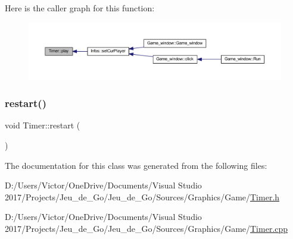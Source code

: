 Here is the caller graph for this function\+:\nopagebreak
\begin{figure}[H]
\begin{center}
\leavevmode
\includegraphics[width=350pt]{class_timer_a84acbe09a8dddae46c997c57a70c5076_icgraph}
\end{center}
\end{figure}
\mbox{\label{class_timer_aa3f7871196bb56202af2bc982bfbfff6}} 
\subsubsection{\texorpdfstring{restart()}{restart()}}
{\footnotesize\ttfamily void Timer\+::restart (\begin{DoxyParamCaption}{ }\end{DoxyParamCaption})}



The documentation for this class was generated from the following files\+:\begin{DoxyCompactItemize}
\item 
D\+:/\+Users/\+Victor/\+One\+Drive/\+Documents/\+Visual Studio 2017/\+Projects/\+Jeu\+\_\+de\+\_\+\+Go/\+Jeu\+\_\+de\+\_\+\+Go/\+Sources/\+Graphics/\+Game/\hyperlink{_timer_8h}{Timer.\+h}\item 
D\+:/\+Users/\+Victor/\+One\+Drive/\+Documents/\+Visual Studio 2017/\+Projects/\+Jeu\+\_\+de\+\_\+\+Go/\+Jeu\+\_\+de\+\_\+\+Go/\+Sources/\+Graphics/\+Game/\hyperlink{_timer_8cpp}{Timer.\+cpp}\end{DoxyCompactItemize}
